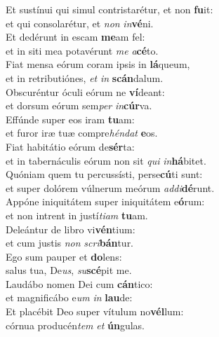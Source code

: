 \oddverse Et sustínui qui simul contristarétur, et non \textbf{fu}it:~\*\\
\oddverse et qui consolarétur, et \textit{non} \textit{in}\textbf{vé}ni.\\
\evenverse Et dedérunt in escam \textbf{me}am fel:~\*\\
\evenverse et in siti mea potavérunt \textit{me} \textit{a}\textbf{cé}to.\\
\oddverse Fiat mensa eórum coram ipsis in \textbf{lá}queum,~\*\\
\oddverse et in retributiónes, \textit{et} \textit{in} \textbf{scán}dalum.\\
\evenverse Obscuréntur óculi eórum ne \textbf{ví}deant:~\*\\
\evenverse et dorsum eórum sem\textit{per} \textit{in}\textbf{cúr}va.\\
\oddverse Effúnde super eos iram \textbf{tu}am:~\*\\
\oddverse et furor iræ tuæ compre\textit{hén}\textit{dat} \textbf{e}os.\\
\evenverse Fiat habitátio eórum de\textbf{sér}ta:~\*\\
\evenverse et in tabernáculis eórum non sit \textit{qui} \textit{in}\textbf{há}bitet.\\
\oddverse Quóniam quem tu percussísti, perse\textbf{cú}ti sunt:~\*\\
\oddverse et super dolórem vúlnerum meórum \textit{ad}\textit{di}\textbf{dé}runt.\\
\evenverse Appóne iniquitátem super iniquitátem e\textbf{ó}rum:~\*\\
\evenverse et non intrent in justí\textit{ti}\textit{am} \textbf{tu}am.\\
\oddverse Deleántur de libro vi\textbf{vén}tium:~\*\\
\oddverse et cum justis \textit{non} \textit{scri}\textbf{bán}tur.\\
\evenverse Ego sum pauper et \textbf{do}lens:~\*\\
\evenverse salus tua, De\textit{us}, \textit{su}\textbf{scé}pit me.\\
\oddverse Laudábo nomen Dei cum \textbf{cán}tico:~\*\\
\oddverse et magnificábo e\textit{um} \textit{in} \textbf{lau}de:\\
\evenverse Et placébit Deo super vítulum no\textbf{vél}lum:~\*\\
\evenverse córnua producén\textit{tem} \textit{et} \textbf{ún}gulas.\\
